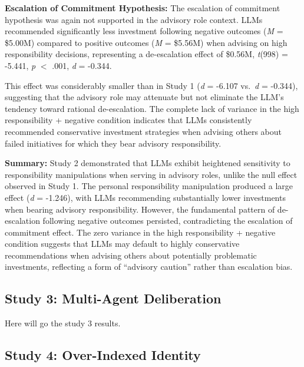 \documentclass[letterpaper]{article} %
\begin{document}
\textbf{Escalation of Commitment Hypothesis:} The escalation of commitment hypothesis was again not supported in the advisory role context. LLMs recommended significantly less investment following negative outcomes (\textit{M} = \$5.00M) compared to positive outcomes (\textit{M} = \$5.56M) when advising on high responsibility decisions, representing a de-escalation effect of \$0.56M, \textit{t}(998) = -5.441, \textit{p} $<$ .001, \textit{d} = -0.344.

This effect was considerably smaller than in Study 1 (\textit{d} = -6.107 vs.\ \textit{d} = -0.344), suggesting that the advisory role may attenuate but not eliminate the LLM's tendency toward rational de-escalation. The complete lack of variance in the high responsibility + negative condition indicates that LLMs consistently recommended conservative investment strategies when advising others about failed initiatives for which they bear advisory responsibility.

\textbf{Summary:} Study 2 demonstrated that LLMs exhibit heightened sensitivity to responsibility manipulations when serving in advisory roles, unlike the null effect observed in Study 1. The personal responsibility manipulation produced a large effect (\textit{d} = -1.246), with LLMs recommending substantially lower investments when bearing advisory responsibility. However, the fundamental pattern of de-escalation following negative outcomes persisted, contradicting the escalation of commitment effect. The zero variance in the high responsibility + negative condition suggests that LLMs may default to highly conservative recommendations when advising others about potentially problematic investments, reflecting a form of ``advisory caution'' rather than escalation bias.

\subsection{Study 3: Multi-Agent Deliberation}


Here will go the study 3 results.

\subsection{Study 4: Over-Indexed Identity}

\end{document}
